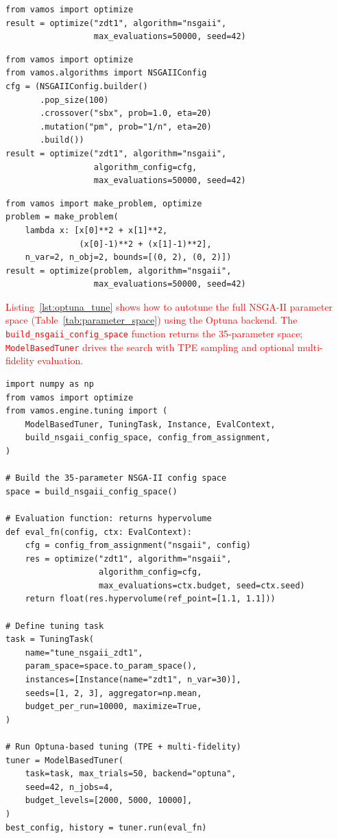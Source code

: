 \documentclass[journal]{IEEEtran}
\newcommand{\VAMOS}{VAMOS}
\begin{document}
\begin{lstlisting}[float=*,caption={Minimal NSGA-II run on ZDT1 in \VAMOS{}.},label={lst:quickstart}]
from vamos import optimize
result = optimize("zdt1", algorithm="nsgaii",
                  max_evaluations=50000, seed=42)
\end{lstlisting}

\begin{lstlisting}[float=*,caption={Builder API for fine-grained configuration.},label={lst:builder}]
from vamos import optimize
from vamos.algorithms import NSGAIIConfig
cfg = (NSGAIIConfig.builder()
       .pop_size(100)
       .crossover("sbx", prob=1.0, eta=20)
       .mutation("pm", prob="1/n", eta=20)
       .build())
result = optimize("zdt1", algorithm="nsgaii",
                  algorithm_config=cfg,
                  max_evaluations=50000, seed=42)
\end{lstlisting}

\begin{lstlisting}[float=*,caption={Defining and optimizing a custom problem.},label={lst:make_problem}]
from vamos import make_problem, optimize
problem = make_problem(
    lambda x: [x[0]**2 + x[1]**2,
               (x[0]-1)**2 + (x[1]-1)**2],
    n_var=2, n_obj=2, bounds=[(0, 2), (0, 2)])
result = optimize(problem, algorithm="nsgaii",
                  max_evaluations=50000, seed=42)
\end{lstlisting}

\textcolor{red}{Listing~\ref{lst:optuna_tune} shows how to autotune the full NSGA-II parameter space (Table~\ref{tab:parameter_space}) using the Optuna backend. The \texttt{build\_nsgaii\_config\_space} function returns the 35-parameter space; \texttt{ModelBasedTuner} drives the search with TPE sampling and optional multi-fidelity evaluation.}

\begin{lstlisting}[float=*,caption={\textcolor{red}{Autotuning NSGA-II with Optuna on ZDT1.}},label={lst:optuna_tune}]
import numpy as np
from vamos import optimize
from vamos.engine.tuning import (
    ModelBasedTuner, TuningTask, Instance, EvalContext,
    build_nsgaii_config_space, config_from_assignment,
)

# Build the 35-parameter NSGA-II config space
space = build_nsgaii_config_space()

# Evaluation function: returns hypervolume
def eval_fn(config, ctx: EvalContext):
    cfg = config_from_assignment("nsgaii", config)
    res = optimize("zdt1", algorithm="nsgaii",
                   algorithm_config=cfg,
                   max_evaluations=ctx.budget, seed=ctx.seed)
    return float(res.hypervolume(ref_point=[1.1, 1.1]))

# Define tuning task
task = TuningTask(
    name="tune_nsgaii_zdt1",
    param_space=space.to_param_space(),
    instances=[Instance(name="zdt1", n_var=30)],
    seeds=[1, 2, 3], aggregator=np.mean,
    budget_per_run=10000, maximize=True,
)

# Run Optuna-based tuning (TPE + multi-fidelity)
tuner = ModelBasedTuner(
    task=task, max_trials=50, backend="optuna",
    seed=42, n_jobs=4,
    budget_levels=[2000, 5000, 10000],
)
best_config, history = tuner.run(eval_fn)
\end{lstlisting}



\end{document}
